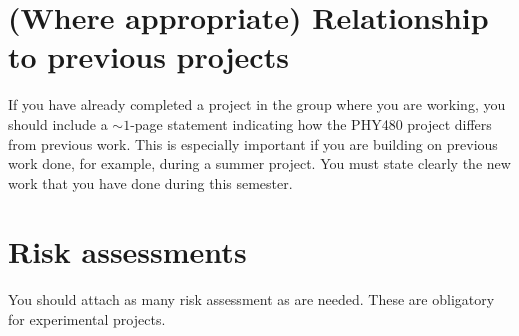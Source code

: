 \documentclass[a4paper,11pt]{article}
\begin{document}
\newpage






\newpage 
\begin{appendix}

\section{(Where appropriate) Relationship to previous projects}
If you have already completed a project in the group where you are working, you should include a $\sim 1$-page statement indicating how the PHY480 project differs from previous work. This is especially important if you are building on previous work done, for example, during a summer project. You must state clearly the new work that you have done during this semester.
\newpage

\section{Risk assessments}
You should attach as many risk assessment as are needed. These are obligatory for experimental projects.

\end{appendix}
\end{document}
